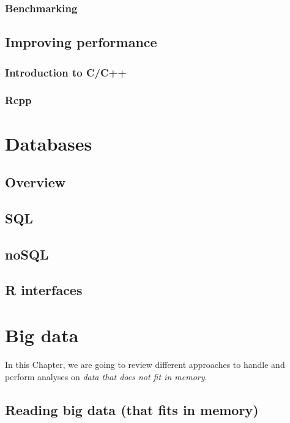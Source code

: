 \documentclass[]{book}
\theoremstyle{definition}
\theoremstyle{definition}
\theoremstyle{definition}
\theoremstyle{remark}
\begin{document}
\subsection{Benchmarking}\label{benchmarking}

\section{Improving performance}\label{improving-performance}

\subsection{Introduction to C/C++}\label{introduction-to-cc}

\subsection{Rcpp}\label{rcpp}

\chapter{Databases}\label{databases}

\section{Overview}\label{overview}

\section{SQL}\label{sql}

\section{noSQL}\label{nosql}

\section{R interfaces}\label{r-interfaces}

\chapter{Big data}\label{bigdata}

In this Chapter, we are going to review different approaches to handle
and perform analyses on \emph{data that does not fit in memory}.

\section{Reading big data (that fits in
memory)}\label{reading-big-data-that-fits-in-memory}
\end{document}
